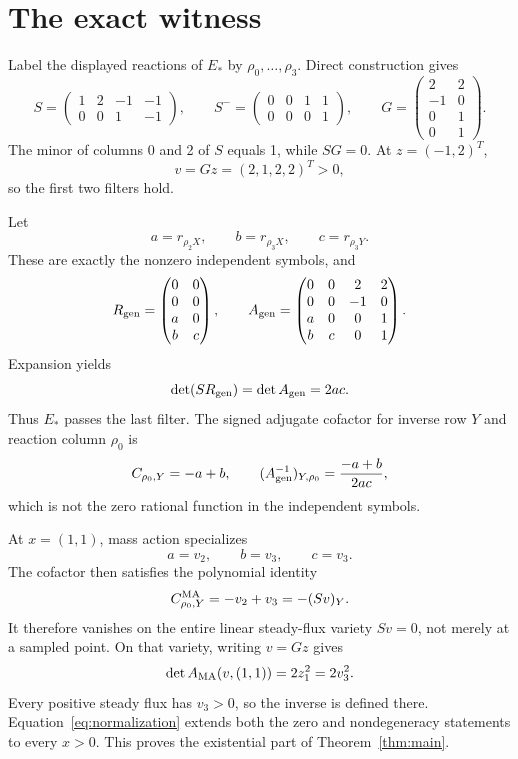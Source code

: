 \documentclass[11pt]{article}
\begin{document}
\section{The exact witness}

Label the displayed reactions of \(E_*\) by \(\rho_0,\ldots,\rho_3\).  Direct
construction gives
\begin{equation}\label{eq:matrices}
 S=\begin{pmatrix}1&2&-1&-1\\0&0&1&-1\end{pmatrix},\qquad
 S^-=\begin{pmatrix}0&0&1&1\\0&0&0&1\end{pmatrix},\qquad
 G=\begin{pmatrix}2&2\\-1&0\\0&1\\0&1\end{pmatrix}.
\end{equation}
The minor of columns 0 and 2 of \(S\) equals 1, while \(SG=0\).  At
\(z=(-1,2)^T\),
\[
 v=Gz=(2,1,2,2)^T>0,
\]
so the first two filters hold.

Let
\[
 a=r_{\rho_2X},\qquad b=r_{\rho_3X},\qquad c=r_{\rho_3Y}.
\]
These are exactly the nonzero independent symbols, and
\[
 R_{\rm gen}=\begin{pmatrix}0&0\\0&0\\a&0\\b&c\end{pmatrix},
 \qquad
 A_{\rm gen}=\begin{pmatrix}
 0&0&2&2\\
 0&0&-1&0\\
 a&0&0&1\\
 b&c&0&1
 \end{pmatrix}.
\]
Expansion yields
\begin{equation}\label{eq:genericdet}
 \det(SR_{\rm gen})=\det A_{\rm gen}=2ac.
\end{equation}
Thus \(E_*\) passes the last filter.  The signed adjugate cofactor for inverse
row \(Y\) and reaction column \(\rho_0\) is
\[
 C_{\rho_0,Y}=-a+b,
 \qquad
 (A_{\rm gen}^{-1})_{Y,\rho_0}=\frac{-a+b}{2ac},
\]
which is not the zero rational function in the independent symbols.

At \(x=(1,1)\), mass action specializes
\[
 a=v_2,\qquad b=v_3,\qquad c=v_3.
\]
The cofactor then satisfies the polynomial identity
\begin{equation}\label{eq:identity}
 C^{\rm MA}_{\rho_0,Y}=-v_2+v_3=-(Sv)_Y.
\end{equation}
It therefore vanishes on the entire linear steady-flux variety \(Sv=0\), not
merely at a sampled point.  On that variety, writing \(v=Gz\) gives
\begin{equation}\label{eq:madet}
 \det A_{\rm MA}(v,(1,1))=2z_1^2=2v_3^2.
\end{equation}
Every positive steady flux has \(v_3>0\), so the inverse is defined there.
Equation~\eqref{eq:normalization} extends both the zero and nondegeneracy
statements to every \(x>0\).  This proves the existential part of
Theorem~\ref{thm:main}.
\end{document}
